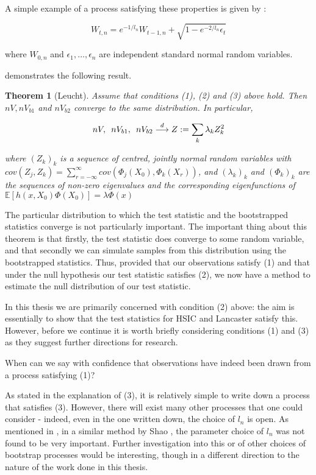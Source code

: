\documentclass[12pt]{article}
\newtheorem{theorem}{Theorem}
\numberwithin{claim}{section}
\numberwithin{lemma}{section}
\numberwithin{theorem}{section}
\begin{document}
A simple example of a process satisfying these properties is given by \cite{chwialkowski2014wild}\cite{leucht2013dependent}:

\[ W_{t,n} = e^{-1/l_n} W_{t-1,n} + \sqrt{1 - e^{-2/l_n} \epsilon_t} \]

where $W_{0,n}$ and $\epsilon_1,\ldots,\epsilon_n$ are independent standard normal random variables. 


\cite{leucht2013dependent} demonstrates the following result.

\begin{theorem} [Leucht]
Assume that conditions \emph{(1)}, \emph{(2)} and \emph{(3)} above hold. Then $nV, nV_{b1}$ and $nV_{b2}$ converge to the same distribution. In particular,

\[nV, \enskip nV_{b1}, \enskip nV_{b2}  \overset{d}{\longrightarrow} Z :=  \sum_k \lambda_k Z_k^2 \]

where $(Z_k)_k$ is a sequence of centred, jointly normal random variables with $cov(Z_j,Z_k) = \sum_{r=-\infty}^{\infty} cov(\Phi_j(X_0),\Phi_k(X_r))$, and $(\lambda_k)_k$ and $(\Phi_k)_k$ are the sequences of non-zero eigenvalues and the corresponding eigenfunctions of $\mathbb{E}[h(x,X_0)\Phi(X_0)] = \lambda \Phi(x)$
\end{theorem}

The particular distribution to which the test statistic and the bootstrapped statistics converge is not particularly important. The important thing about this theorem is that firstly, the test statistic does converge to some random variable, and that secondly we can simulate samples from this distribution using the bootstrapped statistics. Thus, provided that our observations satisfy (1) and that under the null hypothesis our test statistic satisfies (2), we now have a method to estimate the null distribution of our test statistic. 

In this thesis we are primarily concerned with condition (2) above: the aim is essentially to show that the test statistics for HSIC and Lancaster satisfy this. However, before we continue it is worth briefly considering conditions (1) and (3) as they suggest further directions for research. 

When can we say with confidence that observations have indeed been drawn from a process satisfying (1)?

As stated in the explanation of (3), it is relatively simple to write down a process that satisfies (3). However, there will exist many other processes that one could consider - indeed, even in the one written down, the choice of $l_n$ is open. As mentioned in \cite{leucht2013dependent}, in a similar method by Shao \cite{shao2010dependent}, the parameter choice of $l_n$ was not found to be very important. Further investigation into this or of other choices of bootstrap processes would be interesting, though in a different direction to the nature of the work done in this thesis.
\end{document}
